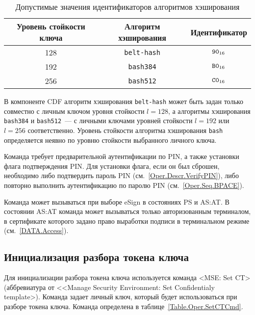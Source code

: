 
\begin{table}[hbt]
\caption{Допустимые значения идентификаторов алгоритмов хэширования}
\label{Table.Oper.AlgRef}
\begin{tabular}{|c|c|c|}
\hline
Уровень стойкости ключа & Алгоритм хэширования  & Идентификатор  \\
\hline
\hline
128 & \texttt{belt-hash} & $\texttt{90}_{16}$ \\
192 & \texttt{bash384} & $\texttt{B0}_{16}$ \\
256 & \texttt{bash512} & $\texttt{C0}_{16}$ \\
\hline
\end{tabular}
\end{table}

\fi


В компоненте CDF алгоритм хэширования \texttt{belt-hash}
может быть задан только совместно с личным ключом 
уровня стойкости $l=128$,
а алгоритмы хэширования \texttt{bash384} и \texttt{bash512}~--- 
с личными ключами уровней стойкости $l=192$ или $l=256$
соответственно.
Уровень стойкости алгоритма хэширования \texttt{bash} определяется 
неявно по уровню стойкости выбранного личного ключа.

Команда требует предварительной аутентификации по PIN,
а также установки флага подтверждения PIN. Для установки флага, 
если он был сброшен, необходимо либо подтвердить пароль PIN 
(см.~\ref{Oper.Descr.VerifyPIN}), либо повторно выполнить аутентификацию по 
паролю PIN (см.~\ref{Oper.Seq.BPACE}). 

Команда может вызываться при выборе eSign в состояниях PS и AS:AT. В состоянии 
AS:AT команда может вызываться только авторизованным терминалом,
в сертификате которого задано право выработки подписи в терминальном режиме 
(см.~\ref{DATA.Access}). 

\subsection{Инициализация разбора токена ключа}
\label{Oper.Descr.SetCT}

Для инициализации разбора токена ключа
используется команда <MSE: Set CT> 
(аббревиатура от <<Manage Security Environment: Set Confidentialy template>).
Команда задает личный ключ, который будет использоваться при разборе токена 
ключа. Команда определена в таблице~\ref{Table.Oper.SetCTCmd}.

